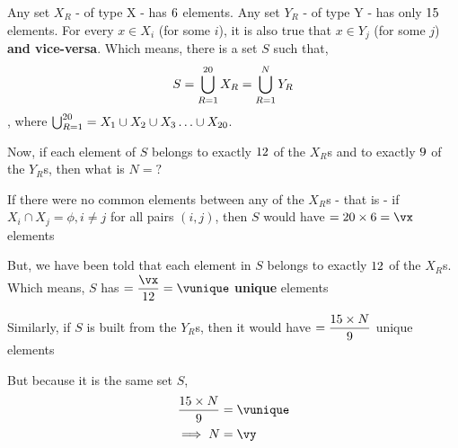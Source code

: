 

\MULTIPLY\va\vc\vx
\DIVIDE\vx\vd\vunique
\MULTIPLY\vunique\ve\a
\DIVIDE\a\vb\vy

\question[5] Any set $X_R$ - of type X - has $6$ elements. Any set $Y_R$ - of type Y - has only $15$ elements. 
For every $x\in X_i$ (for some $i$), it is also true that $x\in Y_j$ (for some $j$) \textbf{and vice-versa}. 
Which means, there is a set $S$ such that,
    \[ S = \bigcup_{R=1}^{20} X_R = \bigcup_{R=1}^N Y_R\], 
where $\bigcup_{R=1}^{20} = X_1\cup X_2\cup X_3 \ldots\cup X_{20}$.

Now, if each element of $S$ belongs to exactly $12$ of the $X_R$s and to exactly 
$9$ of the $Y_R$s, then what is $N=?$ 

\watchout[-4cm]

\ifprintanswers
\fi 

\begin{solution}[\fullpage]
  If there were no common elements between any of the $X_R$s - that is - 
  if $X_i\cap X_j = \phi,i\neq j$ for all pairs $(i,j)$, then $S$ would have 
  $=\vc\times\va = \vx$ elements

  But, we have been told that each element in $S$ belongs to exactly $12$ of the $X_R$s.
  Which means, $S$ has $ =\dfrac\vx\vd = \vunique$ \textbf{unique} elements

  Similarly, if $S$ is built from the $Y_R$s, then it would have $=\dfrac{15\times N}{9}$ 
  unique elements 

  But because it is the same set $S$, 
  \begin{align}
    \dfrac{\vb\times N}{\ve} &= \vunique \\
    \implies N &= \vy
  \end{align}
\end{solution}

